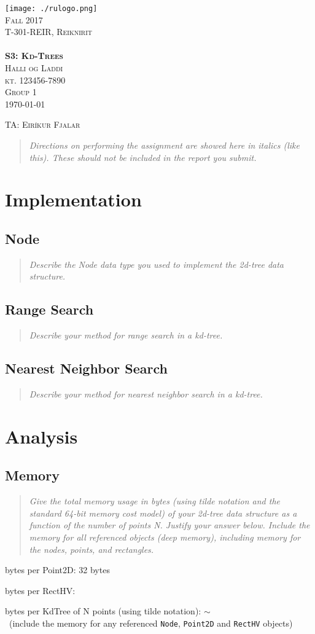 \documentclass[11pt,a4paper,notitlepage]{article}
\newcommand{\semester}{Fall 2017}
\newcommand{\coursename}{Reiknirit}
\newcommand{\courseid}{T-301-REIR}
\newcommand{\assignment}{S3: Kd-Trees}
\newcommand{\dateofcompilation}{\today}
\newcommand{\ssn}{kt. 123456-7890}              %
\newcommand{\group}{1}
\newcommand{\teachingassistant}{TA: Eiríkur Fjalar}   %
\newcommand{\students}{
    Halli og Laddi                             %
}
\newcommand{\maketitlepage}[1]
{
    \begin{titlepage}

        \begin{center}
            \texttt{[image: ./rulogo.png]}\\[1.5cm]

            \textsc{\huge \semester}\\[0.8cm]

            {\textsc{\Huge \courseid, \coursename}}\\[0.4cm]
            \textsc{\LARGE }\\[2.5cm]

            \textbf{\textsc{\Huge #1}}\\[3cm]


            \textsc{\huge \students}\\[0.4cm]
            \textsc{\LARGE \ssn}\\[0.4cm]
            \textsc{\LARGE Group \group}\\[1cm]
            \textsc{\Large \dateofcompilation}


        \end{center}

        \vfill

        \begin{flushleft}
            \textsc{\Large \teachingassistant}
        \end{flushleft}

    \end{titlepage}
}
\newcommand{\explanation}[1]{\begin{quote}\emph{#1} \end{quote}}  %
\begin{document}
    \maketitlepage{\assignment}

\explanation{Directions on performing the assignment are showed here in italics (like this). These should not be included in the report you submit.}

\section{Implementation}

\subsection*{Node}

\explanation{Describe the Node data type you used to implement the
  2d-tree data structure.}

\subsection*{Range Search}
\explanation{Describe your method for range search in a kd-tree.}

\subsection*{Nearest Neighbor Search}
\explanation{Describe your method for nearest neighbor search in a kd-tree.}


\section{Analysis}

\subsection*{Memory}
\explanation{
   Give the total memory usage in bytes (using tilde notation and 
   the standard 64-bit memory cost model) of your 2d-tree data
   structure as a function of the number of points N. Justify your
   answer below.
% 
   Include the memory for all referenced objects (deep memory),
   including memory for the nodes, points, and rectangles.
}

bytes per Point2D: 32 bytes

bytes per RectHV:

bytes per KdTree of N points (using tilde notation):   $\sim$ \\
\ (include the memory for any referenced \texttt{Node}, \texttt{Point2D} and \texttt{RectHV} objects)
\end{document}
